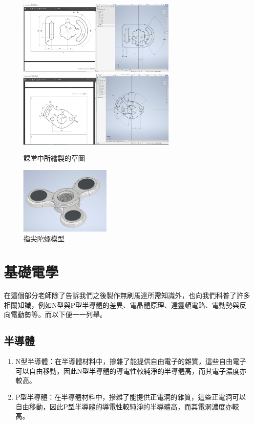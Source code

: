 \documentclass[12pt,a4paper]{article}
\begin{document}
\begin{CJK*}{UTF8}{bkai}
    \begin{figure}[h]
        \centering
        \includegraphics[width=0.7\textwidth]{./images/course_cad_draft1.png}
        \includegraphics[width=0.7\textwidth]{./images/course_cad_draft2.png}
        \caption{課堂中所繪製的草圖}
        \label{fig:course_draft}
    \end{figure}
    \begin{figure}[h]
        \centering
        \includegraphics[width=0.4\textwidth]{./images/fidget_spinnner.png}
        \caption{指尖陀螺模型}
        \label{fig:figet_spinnner}
    \end{figure}

    \newpage

    \section{基礎電學}

    在這個部分老師除了告訴我們之後製作無刷馬達所需知識外，也向我們科普了許多相關知識，例如N型與P型半導體的差異、電晶體原理、達靈頓電路、電動勢與反向電動勢等。而以下便一一列舉。

    \subsection{半導體}
    \begin{enumerate}
        \item N型半導體：在半導體材料中，摻雜了能提供自由電子的雜質，這些自由電子可以自由移動，因此N型半導體的導電性較純淨的半導體高，而其電子濃度亦較高。
        \item P型半導體：在半導體材料中，摻雜了能提供正電洞的雜質，這些正電洞可以自由移動，因此P型半導體的導電性較純淨的半導體高，而其電洞濃度亦較高。
    \end{enumerate}


\end{CJK*}
\end{document}
